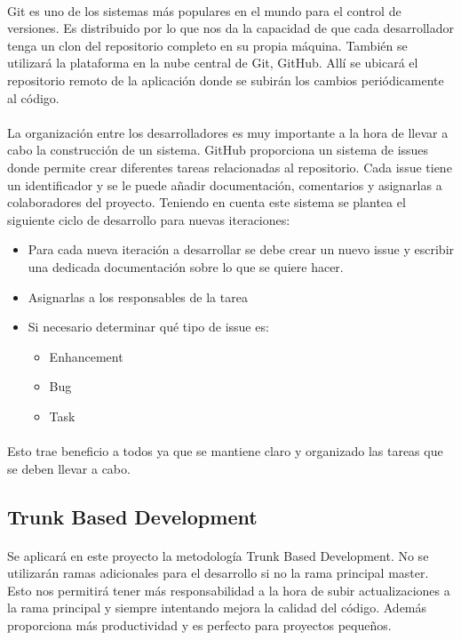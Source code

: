 \paragraph{}
Git es uno de los sistemas más populares en el mundo para el control de versiones. Es distribuido por lo que nos da la capacidad de que cada desarrollador tenga un clon del repositorio completo en su propia máquina. También se utilizará la plataforma en la nube central de Git, GitHub. Allí se ubicará el repositorio remoto de la aplicación donde se subirán los cambios periódicamente al código.

\paragraph{}
La organización entre los desarrolladores es muy importante a la hora de llevar a cabo la construcción de un sistema. GitHub proporciona un sistema de issues donde permite crear diferentes tareas relacionadas al repositorio. Cada issue tiene un identificador y se le puede añadir documentación, comentarios y asignarlas a colaboradores del proyecto. Teniendo en cuenta este sistema se plantea el siguiente ciclo de desarrollo para nuevas iteraciones:
\begin{itemize}
\item
  Para cada nueva iteración a desarrollar se debe crear un nuevo issue y escribir una dedicada documentación sobre lo que se quiere hacer.
\item
  Asignarlas a los responsables de la tarea
\item
  Si necesario determinar qué tipo de issue es:
  \begin{itemize}
  \item
    Enhancement
  \item
    Bug
  \item
    Task
  \end{itemize}
\end{itemize}

\paragraph{}
Esto trae beneficio a todos ya que se mantiene claro y organizado las tareas que se deben llevar a cabo.

\subsection{Trunk Based Development}
\paragraph{}
Se aplicará en este proyecto la metodología Trunk Based Development. No se utilizarán ramas adicionales para el desarrollo si no la rama principal master. Esto nos permitirá tener más responsabilidad a la hora de subir actualizaciones a la rama principal y siempre intentando mejora la calidad del código. Además proporciona más productividad y es perfecto para proyectos pequeños. 

